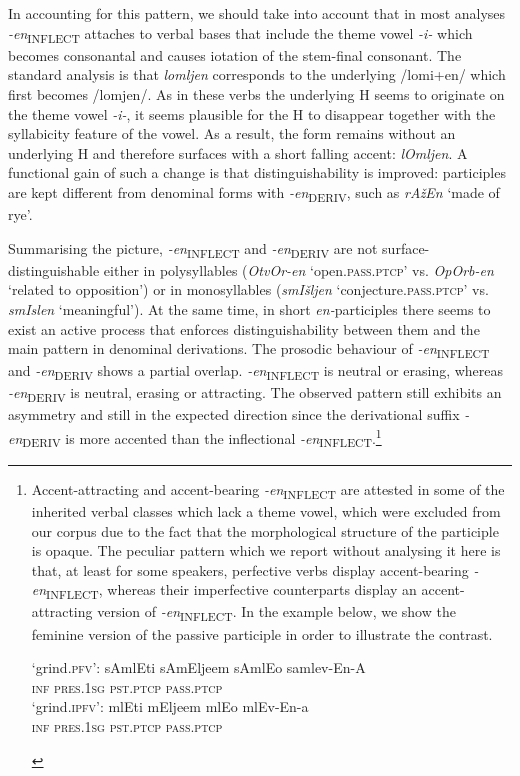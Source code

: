\documentclass[output=paper]{langsci/langscibook}
\begin{document}
In accounting for this pattern, we should take into account that in most analyses \textit{-en}\textsubscript{INFLECT} attaches to verbal bases that include the theme vowel \textit{-i-} which becomes consonantal and causes iotation of the stem-final consonant. The standard analysis is that \textit{lomljen} corresponds to the underlying /lomi+en/ which first becomes /lomjen/. As in these verbs the underlying H seems to originate on the theme vowel \textit{-i-}, it seems plausible for the H to disappear together with the syllabicity feature of the vowel. As a result, the form remains without an underlying H and therefore surfaces with a short falling accent: \textit{lOmljen}. A functional gain of such a change is that distinguishability is improved: participles are kept different from denominal forms with \textit{{-en}}\textsubscript{DERIV}, such as \textit{rAžEn} `made of rye'.

Summarising the picture, \textit{{-en}}\textsubscript{INFLECT}  and \textit{{-en}}\textsubscript{DERIV}  are not surface-distin\-guish\-able either in polysyllables (\textit{OtvOr-en} `open.\textsc{pass.ptcp}' vs. \textit{OpOrb-en}  `related to opposition') or in monosyllables (\textit{smIšljen} `conjecture.\textsc{pass.ptcp}' vs. \textit{smIslen} `meaningful'). At the same time, in short \textit{en-}participles there seems to exist an active process that enforces distinguishability between them and the main pattern in denominal derivations. 
The prosodic behaviour of \textit{-en}\textsubscript{INFLECT} and \textit{-en}\textsubscript{DERIV} shows a partial overlap. \textit{-en}\textsubscript{INFLECT} is neutral or erasing, whereas \textit{-en}\textsubscript{DERIV} is neutral, erasing or attracting. The observed pattern still exhibits an asymmetry and still in the expected direction since  the derivational suffix \textit{-en}\textsubscript{DERIV} is more accented than the inflectional \textit{-en}\textsubscript{INFLECT}.\footnote{Accent-attracting and accent-bearing \textit{-en}\textsubscript{INFLECT} are attested in some of the inherited verbal classes which lack a theme vowel, which were excluded from our corpus due to the fact that the morphological structure of the participle is opaque. The peculiar pattern which we report without analysing it here is that, at least for some speakers, perfective verbs display accent-bearing \textit{-en}\textsubscript{INFLECT}, whereas their imperfective counterparts display an accent-attracting version of {\textit{-en}}\textsubscript{INFLECT}. In the example below, we show the feminine version of the passive participle in order to illustrate the contrast. 
\ea
		\begin{xlist} \ex `grind.\textsc{pfv}': \gll
		sAmlEti	sAmEljeem	sAmlEo samlev-En-A \\
        \textsc{inf} \textsc{pres.1sg} \textsc{pst.ptcp} \textsc{pass.ptcp}
\\ 
\ex `grind.\textsc{ipfv}': \gll  mlEti	mEljeem	mlEo mlEv-En-a 
\\ \textsc{inf} \textsc{pres.1sg} \textsc{pst.ptcp} \textsc{pass.ptcp} \\ 
		\glt
	\end{xlist}
	\z
}
\end{document}
